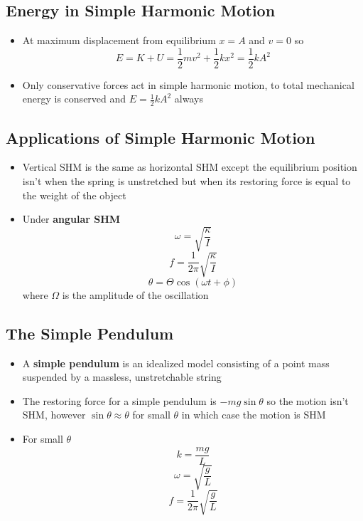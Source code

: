\documentclass{article}
\begin{document}
\subsection{Energy in Simple Harmonic Motion}

\begin{itemize}
    \item At maximum displacement from equilibrium $x=A$ and $v=0$ so \[E=K+U=\frac{1}{2}mv^2+\frac{1}{2}kx^2=\frac{1}{2}kA^2\]

    \item Only conservative forces act in simple harmonic motion, to total mechanical energy is conserved and $E=\frac{1}{2}kA^2$ always
\end{itemize}

\subsection{Applications of Simple Harmonic Motion}

\begin{itemize}
    \item Vertical SHM is the same as horizontal SHM except the equilibrium position isn't when the spring is unstretched but when its restoring force is equal to the weight of the object

    \item Under \textbf{angular SHM} \[\omega=\sqrt{\frac{\kappa}{I}}\] \[f=\frac{1}{2\pi}\sqrt{\frac{\kappa}{I}}\] \[\theta=\Theta\cos(\omega t+\phi)\] where $\Omega$ is the amplitude of the oscillation
\end{itemize}

\subsection{The Simple Pendulum}

\begin{itemize}
    \item A \textbf{simple pendulum} is an idealized model consisting of a point mass suspended by a massless, unstretchable string

    \item The restoring force for a simple pendulum is $-mg\sin\theta$ so the motion isn't SHM, however $\sin\theta \approx \theta$ for small $\theta$ in which case the motion is SHM

    \item For small $\theta$ \[k = \frac{mg}{L}\] \[\omega = \sqrt{\frac{g}{L}}\] \[f = \frac{1}{2\pi} \sqrt{\frac{g}{L}}\]
\end{itemize}
\end{document}
